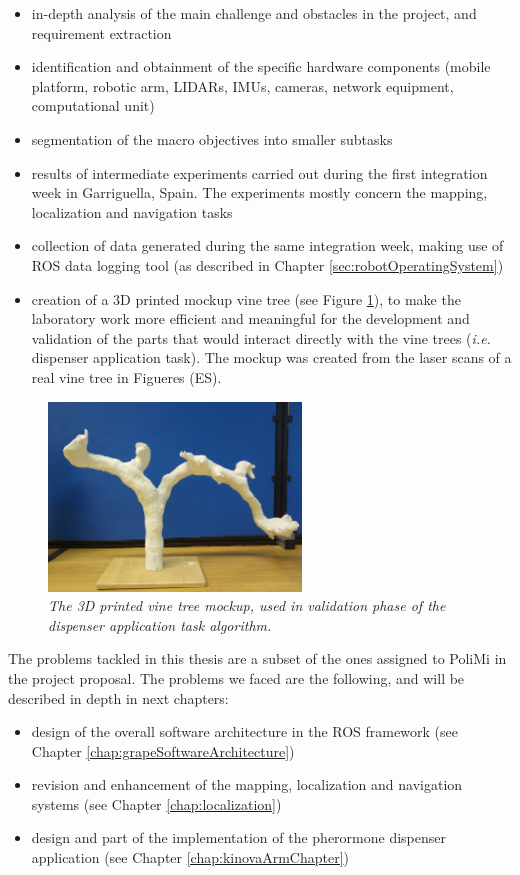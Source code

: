 \begin{itemize}
	\item in-depth analysis of the main challenge and obstacles in the project, and requirement extraction
	\item identification and obtainment of the specific hardware components (mobile platform, robotic arm, \ac{LIDAR}s, \ac{IMU}s, cameras, network equipment, computational unit)
	\item segmentation of the macro objectives into smaller subtasks
	\item results of intermediate experiments carried out during the first integration week in Garriguella, Spain. The experiments mostly concern the mapping, localization and navigation tasks
	\item collection of data generated during the same integration week, making use of \ac{ROS} data logging tool (as described in Chapter \ref{sec:robotOperatingSystem})
	\item creation of a 3D printed mockup vine tree (see Figure \ref{fig:mockupPlant}), to make the laboratory work more efficient and meaningful for the development and validation of the parts that would interact directly with the vine trees (\textit{i.e.} dispenser application task). The mockup was created from the laser scans of a real vine tree in Figueres (ES).
\end{itemize}


\begin{figure}
	\centering
	\includegraphics[width=0.6\textwidth]{Images/grape_project/mockupPlant.jpg}
	\caption{\textit{The 3D printed vine tree mockup, used in validation phase of the dispenser application task algorithm.}}
	\label{fig:mockupPlant}
\end{figure}

The problems tackled in this thesis are a subset of the ones assigned to PoliMi in the project proposal. The problems we faced are the following, and will be described in depth in next chapters:
\begin{itemize}
	\item design of the overall software architecture in the \ac{ROS} framework (see Chapter \ref{chap:grapeSoftwareArchitecture})
	\item revision and enhancement of the mapping, localization and navigation systems (see Chapter \ref{chap:localization})
	\item design and part of the implementation of the pherormone dispenser application (see Chapter \ref{chap:kinovaArmChapter})
\end{itemize}

